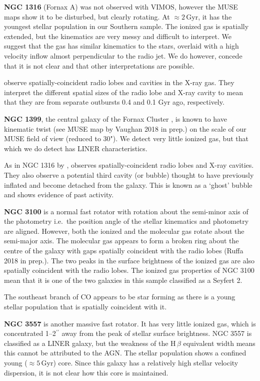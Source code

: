 \textbf{NGC 1316} (Fornax A) was not observed with VIMOS, however the MUSE maps show it to be disturbed, but clearly rotating. At $\approx 2$\,Gyr, it has the youngest stellar population in our Southern sample. The ionized gas is spatially extended, but the kinematics are very messy and difficult to interpret. We suggest that the gas has similar kinematics to the stars, overlaid with a high velocity inflow almost perpendicular to the radio jet. We do however, concede that it is not clear and that other interpretations are possible. 

\citet{Lanz2010} observe spatially-coincident radio lobes and cavities in the X-ray gas. They interpret the different spatial sizes of the radio lobe and X-ray cavity to mean that they are from separate outbursts 0.4 and 0.1 Gyr ago, respectively.

\textbf{NGC 1399}, the central galaxy of the Fornax Cluster \citep{Jordan2007}, is known to have kinematic twist (see MUSE map by Vaughan 2018 in prep.) on the scale of our MUSE field of view (reduced to 30"). We detect very little ionized gas, but that which we do detect has LINER characteristics. 

As in NGC 1316 by \citet{Lanz2010}, \citet{Su2017} observes spatially-coincident radio lobes and X-ray cavities. They also observe a potential third cavity (or bubble) thought to have previously inflated and become detached from the galaxy. This is known as a `ghost' bubble and shows evidence of past activity.

\textbf{NGC 3100} is a normal fast rotator with rotation about the semi-minor axis of the photometry i.e.\ the position angle of the stellar kinematics and photometry are aligned. However, both the ionized and the molecular gas rotate about the semi-major axis. The molecular gas appears to form a broken ring about the centre of the galaxy with gaps spatially coincident with the radio lobes (Ruffa 2018 in prep.). The two peaks in the surface brightness of the ionized gas are also spatially coincident with the radio lobes. The ionized gas properties of NGC 3100 mean that it is one of the two galaxies in this sample classified as a Seyfert 2. 

The southeast branch of CO appears to be star forming as there is a young stellar population that is spatially coincident with it.

\textbf{NGC 3557} is another massive fast rotator. It has very little ionized gas, which is concentrated 1--2$^{\prime\prime}$ away from the peak of stellar surface brightness. NGC 3557 is classified as a LINER galaxy, but the weakness of the H\,$\beta$ equivalent width means this cannot be attributed to the AGN. The stellar population shows a confined young ($\approx 5$\,Gyr) core. Since this galaxy has a relatively high stellar velocity dispersion, it is not clear how this core is maintained. 

